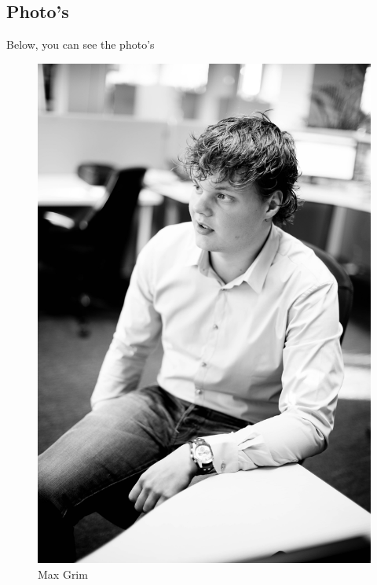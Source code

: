 \documentclass[11pt]{article}
\begin{document}
\newpage
\subsection{Photo's}
Below, you can see the photo's

\begin{figure}[htbp]
  \begin{minipage}[b]{0.25\linewidth}
    \centering
    \includegraphics[width=0.9\linewidth]{max.jpg}
    \caption{Max Grim}
  \end{minipage}
  \hspace{6.0cm}
  \begin{minipage}[b]{0.25\linewidth}
    \centering

\end{minipage}
\end{figure}
\end{document}
